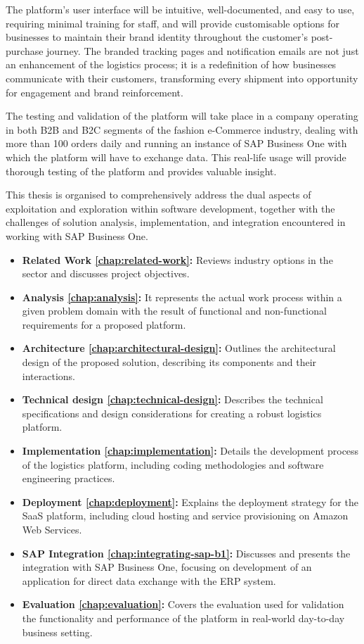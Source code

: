 The platform's user interface will be intuitive, well-documented, and easy to use, requiring minimal training for staff, and will provide customisable options for businesses to maintain their brand identity throughout the customer's post-purchase journey.
The branded tracking pages and notification emails are not just an enhancement of the logistics process; it is a redefinition of how businesses communicate with their customers, transforming every shipment into opportunity for engagement and brand reinforcement.

The testing and validation of the platform will take place in a company operating in both \ac{B2B} and \ac{B2C} segments of the fashion e-Commerce industry, dealing with more than 100 orders daily and running an instance of SAP Business One with which the platform will have to exchange data. 
This real-life usage will provide thorough testing of the platform and provides valuable insight.

% 

This thesis is organised to comprehensively address the dual aspects of exploitation and exploration within software development, together with the challenges of solution analysis, implementation, and integration encountered in working with SAP Business One.

\begin{itemize}
    \item \textbf{Related Work \ref{chap:related-work}:} Reviews industry options in the sector and discusses project objectives.
    \item \textbf{Analysis \ref{chap:analysis}:} It represents the actual work process within a given problem domain with the result of functional and non-functional requirements for a proposed platform.
    \item \textbf{Architecture \ref{chap:architectural-design}:} Outlines the architectural design of the proposed solution, describing its components and their interactions.
    \item \textbf{Technical design \ref{chap:technical-design}:} Describes the technical specifications and design considerations for creating a robust logistics platform.
    \item \textbf{Implementation \ref{chap:implementation}:} Details the development process of the logistics platform, including coding methodologies and software engineering practices.
    \item \textbf{Deployment \ref{chap:deployment}:} Explains the deployment strategy for the SaaS platform, including cloud hosting and service provisioning on Amazon Web Services.
    \item \textbf{SAP Integration \ref{chap:integrating-sap-b1}:} Discusses and presents the integration with SAP Business One, focusing on development of an application for direct data exchange with the ERP system. 
    \item \textbf{Evaluation \ref{chap:evaluation}:} Covers the evaluation used for validation the functionality and performance of the platform in real-world day-to-day business setting.
\end{itemize}